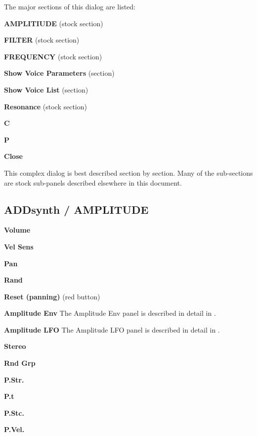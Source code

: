    The major sections of this dialog are listed:

   \begin{enumber}
      \item \textbf{AMPLITIUDE} (stock section)
      \item \textbf{FILTER} (stock section)
      \item \textbf{FREQUENCY} (stock section)
      \item \textbf{Show Voice Parameters} (section)
      \item \textbf{Show Voice List} (section)
      \item \textbf{Resonance} (stock section)
      \item \textbf{C}
      \item \textbf{P}
      \item \textbf{Close}
   \end{enumber}

   This complex dialog is best described section by section.
   Many of the sub-sections are stock sub-panels described elsewhere
   in this document.

\subsection{ADDsynth / AMPLITUDE}
\label{subsec:addsynth_amplitude}

   \begin{enumber}
      \item \textbf{Volume}
      \item \textbf{Vel Sens}
      \item \textbf{Pan}
      \item \textbf{Rand}
      \item \textbf{Reset (panning)} (red button)
      \item \textbf{Amplitude Env}
         The Amplitude Env panel is described in detail in
         .
      \item \textbf{Amplitude LFO}
         The Amplitude LFO panel is described in detail in
         .
      \item \textbf{Stereo}
      \item \textbf{Rnd Grp}
      \item \textbf{P.Str.}
      \item \textbf{P.t}
      \item \textbf{P.Stc.}
      \item \textbf{P.Vel.}
   \end{enumber}


